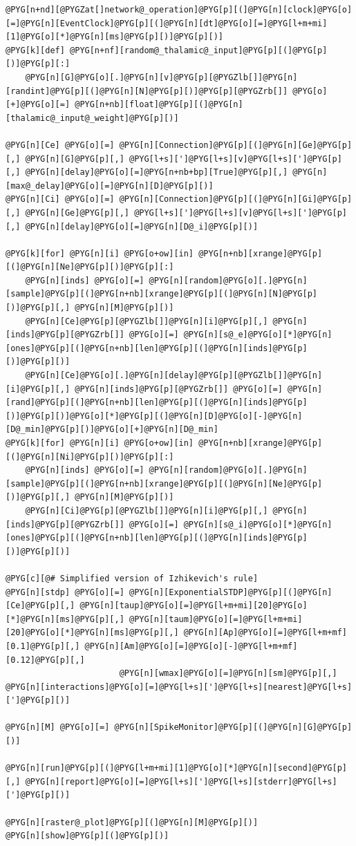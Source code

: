 \documentclass[letterpaper,10pt,english]{manual}
\begin{document}
\begin{Verbatim}[commandchars=@\[\]]
@PYG[n+nd][@PYGZat[]network@_operation]@PYG[p][(]@PYG[n][clock]@PYG[o][=]@PYG[n][EventClock]@PYG[p][(]@PYG[n][dt]@PYG[o][=]@PYG[l+m+mi][1]@PYG[o][*]@PYG[n][ms]@PYG[p][)]@PYG[p][)]
@PYG[k][def] @PYG[n+nf][random@_thalamic@_input]@PYG[p][(]@PYG[p][)]@PYG[p][:]
    @PYG[n][G]@PYG[o][.]@PYG[n][v]@PYG[p][@PYGZlb[]]@PYG[n][randint]@PYG[p][(]@PYG[n][N]@PYG[p][)]@PYG[p][@PYGZrb[]] @PYG[o][+]@PYG[o][=] @PYG[n+nb][float]@PYG[p][(]@PYG[n][thalamic@_input@_weight]@PYG[p][)]

@PYG[n][Ce] @PYG[o][=] @PYG[n][Connection]@PYG[p][(]@PYG[n][Ge]@PYG[p][,] @PYG[n][G]@PYG[p][,] @PYG[l+s][']@PYG[l+s][v]@PYG[l+s][']@PYG[p][,] @PYG[n][delay]@PYG[o][=]@PYG[n+nb+bp][True]@PYG[p][,] @PYG[n][max@_delay]@PYG[o][=]@PYG[n][D]@PYG[p][)]
@PYG[n][Ci] @PYG[o][=] @PYG[n][Connection]@PYG[p][(]@PYG[n][Gi]@PYG[p][,] @PYG[n][Ge]@PYG[p][,] @PYG[l+s][']@PYG[l+s][v]@PYG[l+s][']@PYG[p][,] @PYG[n][delay]@PYG[o][=]@PYG[n][D@_i]@PYG[p][)]

@PYG[k][for] @PYG[n][i] @PYG[o+ow][in] @PYG[n+nb][xrange]@PYG[p][(]@PYG[n][Ne]@PYG[p][)]@PYG[p][:]
    @PYG[n][inds] @PYG[o][=] @PYG[n][random]@PYG[o][.]@PYG[n][sample]@PYG[p][(]@PYG[n+nb][xrange]@PYG[p][(]@PYG[n][N]@PYG[p][)]@PYG[p][,] @PYG[n][M]@PYG[p][)]
    @PYG[n][Ce]@PYG[p][@PYGZlb[]]@PYG[n][i]@PYG[p][,] @PYG[n][inds]@PYG[p][@PYGZrb[]] @PYG[o][=] @PYG[n][s@_e]@PYG[o][*]@PYG[n][ones]@PYG[p][(]@PYG[n+nb][len]@PYG[p][(]@PYG[n][inds]@PYG[p][)]@PYG[p][)]
    @PYG[n][Ce]@PYG[o][.]@PYG[n][delay]@PYG[p][@PYGZlb[]]@PYG[n][i]@PYG[p][,] @PYG[n][inds]@PYG[p][@PYGZrb[]] @PYG[o][=] @PYG[n][rand]@PYG[p][(]@PYG[n+nb][len]@PYG[p][(]@PYG[n][inds]@PYG[p][)]@PYG[p][)]@PYG[o][*]@PYG[p][(]@PYG[n][D]@PYG[o][-]@PYG[n][D@_min]@PYG[p][)]@PYG[o][+]@PYG[n][D@_min]
@PYG[k][for] @PYG[n][i] @PYG[o+ow][in] @PYG[n+nb][xrange]@PYG[p][(]@PYG[n][Ni]@PYG[p][)]@PYG[p][:]
    @PYG[n][inds] @PYG[o][=] @PYG[n][random]@PYG[o][.]@PYG[n][sample]@PYG[p][(]@PYG[n+nb][xrange]@PYG[p][(]@PYG[n][Ne]@PYG[p][)]@PYG[p][,] @PYG[n][M]@PYG[p][)]
    @PYG[n][Ci]@PYG[p][@PYGZlb[]]@PYG[n][i]@PYG[p][,] @PYG[n][inds]@PYG[p][@PYGZrb[]] @PYG[o][=] @PYG[n][s@_i]@PYG[o][*]@PYG[n][ones]@PYG[p][(]@PYG[n+nb][len]@PYG[p][(]@PYG[n][inds]@PYG[p][)]@PYG[p][)]

@PYG[c][@# Simplified version of Izhikevich's rule]
@PYG[n][stdp] @PYG[o][=] @PYG[n][ExponentialSTDP]@PYG[p][(]@PYG[n][Ce]@PYG[p][,] @PYG[n][taup]@PYG[o][=]@PYG[l+m+mi][20]@PYG[o][*]@PYG[n][ms]@PYG[p][,] @PYG[n][taum]@PYG[o][=]@PYG[l+m+mi][20]@PYG[o][*]@PYG[n][ms]@PYG[p][,] @PYG[n][Ap]@PYG[o][=]@PYG[l+m+mf][0.1]@PYG[p][,] @PYG[n][Am]@PYG[o][=]@PYG[o][-]@PYG[l+m+mf][0.12]@PYG[p][,]
                       @PYG[n][wmax]@PYG[o][=]@PYG[n][sm]@PYG[p][,] @PYG[n][interactions]@PYG[o][=]@PYG[l+s][']@PYG[l+s][nearest]@PYG[l+s][']@PYG[p][)]

@PYG[n][M] @PYG[o][=] @PYG[n][SpikeMonitor]@PYG[p][(]@PYG[n][G]@PYG[p][)]

@PYG[n][run]@PYG[p][(]@PYG[l+m+mi][1]@PYG[o][*]@PYG[n][second]@PYG[p][,] @PYG[n][report]@PYG[o][=]@PYG[l+s][']@PYG[l+s][stderr]@PYG[l+s][']@PYG[p][)]

@PYG[n][raster@_plot]@PYG[p][(]@PYG[n][M]@PYG[p][)]
@PYG[n][show]@PYG[p][(]@PYG[p][)]
\end{Verbatim}
\end{document}
